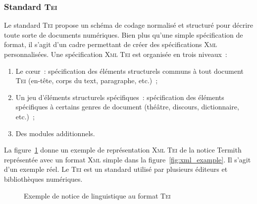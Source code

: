       \subsubsection{Standard \textsc{Tei}}
      \label{subsubsec:main-automatic_evaluation_of_keyphrase_annotation-methodology-data_format-tei}
        Le standard \textsc{Tei} propose un schéma de codage normalisé et
        structuré pour décrire toute sorte de documents numériques. Bien plus
        qu'une simple spécification de format, il s'agit d'un cadre permettant
        de créer des spécifications \textsc{Xml} personnalisées. Une
        spécification \textsc{Xml} \textsc{Tei} est organisée en trois niveaux~:
        \begin{enumerate}
          \item{Le c\oe{}ur~: spécification des éléments structurels communs à
                tout document \textsc{Tei} (en-tête, corps du text, paragraphe,
                etc.)~;}
          \item{Un jeu d'éléments structurels spécifiques~: spécification des
                éléments spécifiques à certains genres de document (théâtre,
                discours, dictionnaire, etc.)~;}
          \item{Des modules additionnels.}
        \end{enumerate}
        La figure~\ref{fig:tei_example} donne un exemple de représentation
        \textsc{Xml} \textsc{Tei} de la notice Termith représentée avec un
        format \textsc{Xml} simple dans la figure~\ref{fig:xml_example}. Il
        s'agit d'un exemple réel. Le \textsc{Tei} est un standard utilisé par
        plusieurs éditeurs et bibliothèques numériques.
        \begin{figure}[h!]
          \footnotesize
          \setlstxml
          
          \caption{Exemple de notice de linguistique au format \textsc{Tei}
                   \label{fig:tei_example}}
        \end{figure}

